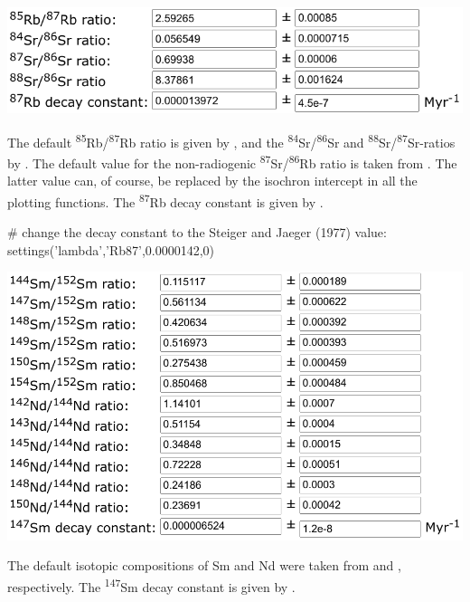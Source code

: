 \begin{refsection}
\noindent\begin{minipage}[t]{.6\linewidth}
\strut\vspace*{-\baselineskip}\newline
\includegraphics[width=\linewidth]{../figures/RbSrLambda.png}
\end{minipage}
\begin{minipage}[t]{.4\linewidth}
The default \textsuperscript{85}Rb/\textsuperscript{87}Rb ratio is
given by \citet{catanzaro1969}, and the
\textsuperscript{84}Sr/\textsuperscript{86}Sr and
\textsuperscript{88}Sr/\textsuperscript{87}Sr-ratios by
\citet{moore1982}. The default value for the non-radiogenic
\textsuperscript{87}Sr/\textsuperscript{86}Rb ratio is taken from
\citet{compston1971}. The latter value can, of course, be replaced by
the isochron intercept in all the plotting functions. The
\textsuperscript{87}Rb decay constant is given by \citet{villa2015}.
\end{minipage}

\begin{script}
# change the decay constant to the Steiger and Jaeger (1977) value:
settings('lambda','Rb87',0.0000142,0)
\end{script}

\noindent\begin{minipage}[t]{.6\linewidth}
\strut\vspace*{-\baselineskip}\newline
\includegraphics[width=\linewidth]{../figures/SmNdLambda.png}
\end{minipage}
\begin{minipage}[t]{.4\linewidth}
  The default isotopic compositions of Sm and Nd were taken from
  \citet{chang2002} and \citet{zhao2005}, respectively. The
  \textsuperscript{147}Sm decay constant is given by
  \citet{lugmair1978}.
\end{minipage}


\end{refsection}
